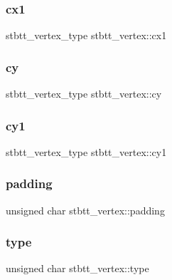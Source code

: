 \hypertarget{structstbtt__vertex_a1c45a8d41727b24b84f97a944f2b800a}{}\label{structstbtt__vertex_a1c45a8d41727b24b84f97a944f2b800a} 
\subsubsection{\texorpdfstring{cx1}{cx1}}
{\footnotesize\ttfamily stbtt\+\_\+vertex\+\_\+type stbtt\+\_\+vertex\+::cx1}

\hypertarget{structstbtt__vertex_a5610d6335aa6962d970fc7fd2225545e}{}\label{structstbtt__vertex_a5610d6335aa6962d970fc7fd2225545e} 
\subsubsection{\texorpdfstring{cy}{cy}}
{\footnotesize\ttfamily stbtt\+\_\+vertex\+\_\+type stbtt\+\_\+vertex\+::cy}

\hypertarget{structstbtt__vertex_a68227d28643f5667064fa3c385f4ea7d}{}\label{structstbtt__vertex_a68227d28643f5667064fa3c385f4ea7d} 
\subsubsection{\texorpdfstring{cy1}{cy1}}
{\footnotesize\ttfamily stbtt\+\_\+vertex\+\_\+type stbtt\+\_\+vertex\+::cy1}

\hypertarget{structstbtt__vertex_a8bd328747e8ea018612960a52e3e3ede}{}\label{structstbtt__vertex_a8bd328747e8ea018612960a52e3e3ede} 
\subsubsection{\texorpdfstring{padding}{padding}}
{\footnotesize\ttfamily unsigned char stbtt\+\_\+vertex\+::padding}

\hypertarget{structstbtt__vertex_aa325b3707b88e7e104c0de46bb2bf395}{}\label{structstbtt__vertex_aa325b3707b88e7e104c0de46bb2bf395} 
\subsubsection{\texorpdfstring{type}{type}}
{\footnotesize\ttfamily unsigned char stbtt\+\_\+vertex\+::type}

